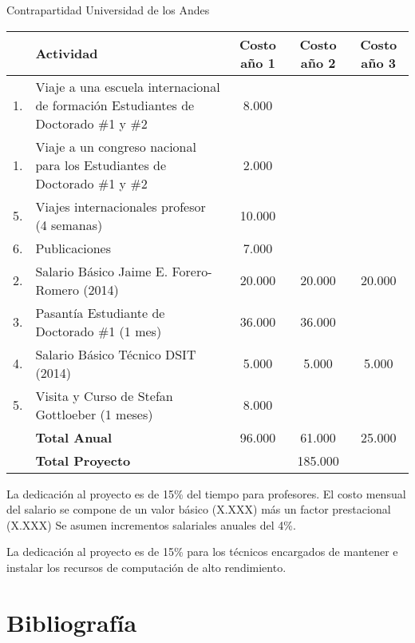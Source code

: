 \documentclass[spanish,notitlepage,letterpaper,11pt]{article} %
\begin{document}
Contrapartidad Universidad de los Andes


\begin{tabular}{|l |p{4.5cm}| c |c |c|}\hline
& Actividad & Costo a\~no 1 & Costo a\~no 2 & Costo a\~no 3\\\hline
1. & Viaje a una escuela internacional de formaci\'on Estudiantes de
Doctorado \#1 y \#2 & 8.000 & & \\\hline
1. & Viaje a un congreso nacional para los Estudiantes de
Doctorado \#1 y \#2 & 2.000 & & \\\hline
5. & Viajes internacionales profesor (4 semanas) & 10.000 & & \\ \hline
6. & Publicaciones &  7.000 & & \\\hline 
2. & Salario B\'asico Jaime E. Forero-Romero (2014) & 20.000 & 20.000
& 20.000 \\\hline  

3. & Pasant\'ia Estudiante de Doctorado \#1 (1 mes) & 36.000 &
36.000 & \\\hline

4. & Salario B\'asico T\'ecnico DSIT (2014) & 5.000 & 5.000
& 5.000 \\\hline  

5. & Visita y Curso de Stefan Gottloeber (1 meses) & 8.000 & & \\\hline

& {\bf Total Anual} & 96.000 & 61.000 & 25.000\\\hline
& {{\bf Total Proyecto}} & \multicolumn{3}{|c|}{185.000}\\\hline

\end{tabular} 

La dedicaci\'on al proyecto es de 15\% del tiempo para
profesores. El costo mensual del salario se compone de un valor
b\'asico (X.XXX) m\'as un factor prestacional (X.XXX) Se asumen
incrementos salariales anuales del 4\%. 

La dedicaci\'on al proyecto es de 15\% para los t\'ecnicos encargados
de mantener e instalar los recursos de computaci\'on de alto
rendimiento. 


\section{Bibliograf\'ia}

{}

\end{document}
